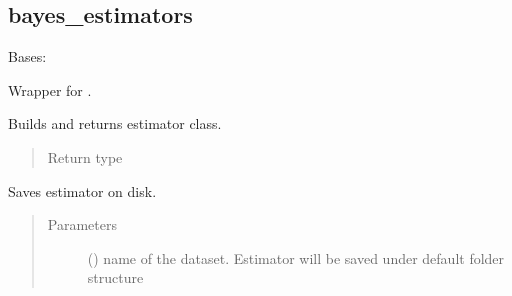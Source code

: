 \documentclass[letterpaper,10pt,english]{sphinxmanual}
\begin{document}
\subsection{bayes\_estimators}
\label{\detokenize{estimators:bayes-estimators}}\label{\detokenize{estimators:module-mleap.estimators.bayes_estimators}}

\begin{fulllineitems}
\label{\detokenize{estimators:mleap.estimators.bayes_estimators.Bernoulli_Naive_Bayes}}
Bases: {\hyperref[\detokenize{estimators:mleap.estimators.mleap_estimator.MleapEstimator}]{}}

Wrapper for .

\begin{fulllineitems}
\label{\detokenize{estimators:mleap.estimators.bayes_estimators.Bernoulli_Naive_Bayes.build}}
Builds and returns estimator class.
\begin{quote}\begin{description}
\item[{Return type}] \leavevmode
{}

\end{description}\end{quote}

\end{fulllineitems}


\begin{fulllineitems}
\label{\detokenize{estimators:mleap.estimators.bayes_estimators.Bernoulli_Naive_Bayes.save}}
Saves estimator on disk.
\begin{quote}\begin{description}
\item[{Parameters}] \leavevmode
{} () \textendash{} name of the dataset. Estimator will be saved under default folder structure 

\end{description}\end{quote}

\end{fulllineitems}


\end{fulllineitems}
\end{document}
